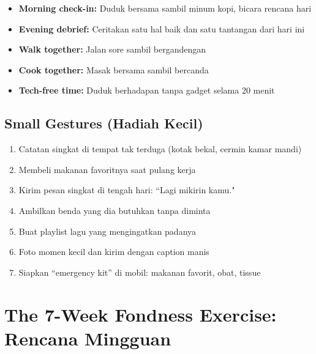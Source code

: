 \begin{tipbox}
\begin{itemize}
    \item[$\bullet$] \textbf{Morning check-in:} Duduk bersama sambil minum kopi, bicara rencana hari
    \item[$\bullet$] \textbf{Evening debrief:} Ceritakan satu hal baik dan satu tantangan dari hari ini
    \item[$\bullet$] \textbf{Walk together:} Jalan sore sambil bergandengan
    \item[$\bullet$] \textbf{Cook together:} Masak bersama sambil bercanda
    \item[$\bullet$] \textbf{Tech-free time:} Duduk berhadapan tanpa gadget selama 20 menit
\end{itemize}
\end{tipbox}

\subsection{Small Gestures (Hadiah Kecil)}

\begin{enumerate}
    \item Catatan singkat di tempat tak terduga (kotak bekal, cermin kamar mandi)
    \item Membeli makanan favoritnya saat pulang kerja
    \item Kirim pesan singkat di tengah hari: ``Lagi mikirin kamu."
    \item Ambilkan benda yang dia butuhkan tanpa diminta
    \item Buat playlist lagu yang mengingatkan padanya
    \item Foto momen kecil dan kirim dengan caption manis
    \item Siapkan ``emergency kit'' di mobil: makanan favorit, obat, tissue
\end{enumerate}

\section{The 7-Week Fondness Exercise: Rencana Mingguan}

